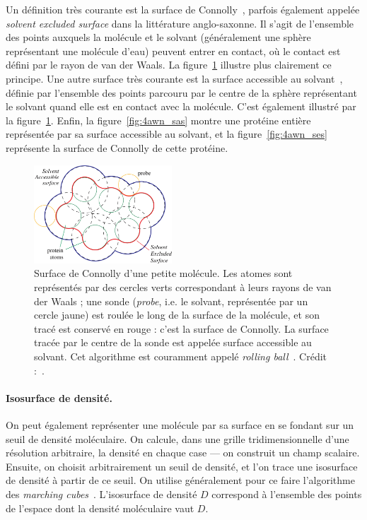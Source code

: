 	Un définition très courante est la surface de Connolly~\cite{connolly1983analytical}, parfois également appelée \emph{solvent excluded surface} dans la littérature anglo-saxonne. Il s'agit de l'ensemble des points auxquels la molécule et \og le solvant \fg{} (généralement une sphère représentant une molécule d'eau) peuvent entrer en contact, où le contact est défini par le rayon de van der Waals. La figure~\ref{fig:connolly} illustre plus clairement ce principe. Une autre surface très courante est la surface accessible au solvant~\cite{lee1971interpretation}, définie par l'ensemble des points parcouru par le centre de la sphère représentant le solvant quand elle est en contact avec la molécule. C'est également illustré par la figure~\ref{fig:connolly}. Enfin, la figure~\ref{fig:4awn_sas} montre une protéine entière représentée par sa surface accessible au solvant, et la figure~\ref{fig:4awn_ses} représente la surface de Connolly de cette protéine.

	\begin{figure}
		\centering
		\includegraphics[width=0.46\textwidth]{figures/ch1/connolly}
		\caption[Surface de Connolly et accessible au solvant]{Surface de Connolly d'une petite molécule. Les atomes sont représentés par des cercles verts correspondant à leurs rayons de van der Waals ; une sonde (\emph{probe}, i.e. le solvant, représentée par un cercle jaune) est \og roulée \fg{} le long de la surface de la molécule, et son tracé est conservé en rouge : c'est la surface de Connolly. La surface tracée par le centre de la sonde est appelée surface accessible au solvant. Cet algorithme est couramment appelé \emph{rolling ball}~\cite{shrake1973environment, connolly1983analytical, connolly1993molecular}. Crédit :~\cite{krone2009interactive}.}
		\label{fig:connolly}
	\end{figure}
		
	\paragraph{Isosurface de densité.} On peut également représenter une molécule par sa surface en se fondant sur un seuil de densité moléculaire. On calcule, dans une grille tridimensionnelle d'une résolution arbitraire, la densité en chaque case --- on construit un champ scalaire. Ensuite, on choisit arbitrairement un seuil de densité, et l'on trace une isosurface de densité à partir de ce seuil. On utilise généralement pour ce faire l'algorithme des \emph{marching cubes}~\cite{lorensen1987marching}.%
	L'isosurface de densité $D$ correspond à l'ensemble des points de l'espace dont la densité moléculaire vaut $D$.
		
